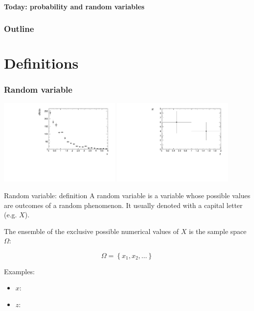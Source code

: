 \documentclass[9pt]{beamer}
\begin{document}
\begin{frame}[plain]
 \textbf{Today: probability and random variables}
\end{frame}

\begin{frame}[plain]
 \frametitle{Outline}
 
 \tableofcontents
\end{frame}

\section{Definitions}

\begin{frame}
 \frametitle{Random variable}
 
 \includegraphics[width=0.45\textwidth]{randomvar.pdf}\hfill
 \includegraphics[width=0.45\textwidth]{randomvar3.pdf}
 
 \begin{block}{Random variable: definition}
  A random variable is a variable whose possible values are outcomes of a random phenomenon. It usually denoted with a capital letter (e.g. $X$).
  
  The ensemble of the exclusive possible numerical values of $X$ is the sample space $\Omega$:
  
  $$\Omega = \left\{ x_1, x_2, \dots \right\}$$
 \end{block}
 
 Examples:
 
 \begin{itemize}
  \item $x$: \only<2>{lifetime of a particle? $\Omega = [0, +\infty [$}
  \item $z$: 
 \end{itemize}
\end{frame}
\end{document}
